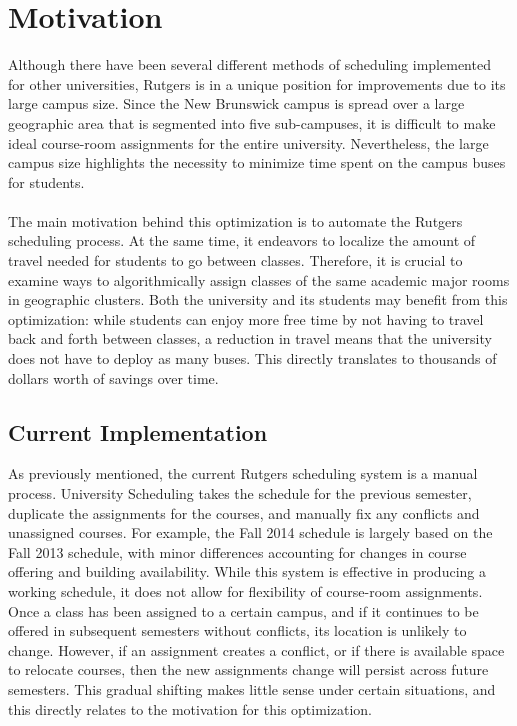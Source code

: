\documentclass[12pt]{article}
\begin{document}
\section{Motivation}
	Although there have been several different methods of scheduling implemented
	for other universities, Rutgers is in a unique position for improvements due to
	its large campus size. Since the New Brunswick campus is spread over a large
	geographic area that is segmented into five sub-campuses, it is difficult to
	make ideal course-room assignments for the entire university. Nevertheless,
	the large campus size highlights the necessity to minimize time spent on the
	campus buses for students. 
	\\\\
	The main motivation behind this optimization is to automate the Rutgers
	scheduling process. At the same time, it endeavors to localize the amount of
	travel needed for students to go between classes. Therefore, it is crucial to
	examine ways to algorithmically assign classes of the same academic major rooms
	in geographic clusters. Both the university and its students may benefit from
	this optimization: while students can enjoy more free time by not having to
	travel back and forth between classes, a reduction in travel means that the
	university does not have to deploy as many buses. This directly translates to
	thousands of dollars worth of savings over time. 

	\subsection{Current Implementation}
		As previously mentioned, the current Rutgers scheduling system is a manual
		process. University Scheduling takes the schedule for the previous semester,
		duplicate the assignments for the courses, and manually fix any conflicts and
		unassigned courses. For example, the Fall 2014 schedule is largely based on the
		Fall 2013 schedule, with minor differences accounting for changes in course
		offering and building availability. While this system is effective in producing
		a working schedule, it does not allow for flexibility of course-room
		assignments. Once a class has been assigned to a certain campus, and if it
		continues to be offered in subsequent semesters without conflicts, its location
		is unlikely to change. However, if an assignment creates a conflict, or if
		there is available space to relocate courses, then the new assignments change
		will persist across future semesters. This gradual shifting makes little sense
		under certain situations, and this directly relates to the motivation for this
		optimization.
\end{document}
